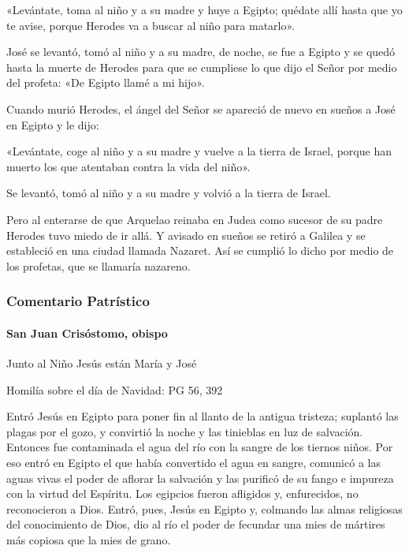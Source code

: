 \documentclass[]{article}
\let\oldparagraph\paragraph
\renewcommand{\paragraph}[1]{\oldparagraph{#1}\mbox{}}
\begin{document}
«Levántate, toma al niño y a su madre y huye a Egipto; quédate allí
hasta que yo te avise, porque Herodes va a buscar al niño para matarlo».

José se levantó, tomó al niño y a su madre, de noche, se fue a Egipto y
se quedó hasta la muerte de Herodes para que se cumpliese lo que dijo el
Señor por medio del profeta: «De Egipto llamé a mi hijo».

Cuando murió Herodes, el ángel del Señor se apareció de nuevo en sueños
a José en Egipto y le dijo:

«Levántate, coge al niño y a su madre y vuelve a la tierra de Israel,
porque han muerto los que atentaban contra la vida del niño».

Se levantó, tomó al niño y a su madre y volvió a la tierra de Israel.

Pero al enterarse de que Arquelao reinaba en Judea como sucesor de su
padre Herodes tuvo miedo de ir allá. Y avisado en sueños se retiró a
Galilea y se estableció en una ciudad llamada Nazaret. Así se cumplió lo
dicho por medio de los profetas, que se llamaría nazareno.

\protect\hypertarget{_Toc448662810}{}{\protect\hypertarget{_Toc448690329}{}{}}

\subsubsection{Comentario Patrístico}\label{comentario-patruxedstico-8}

\paragraph{San Juan Crisóstomo,
obispo}\label{san-juan-crisuxf3stomo-obispo}

Junto al Niño Jesús están María y José

Homilía sobre el día de Navidad: PG 56, 392

Entró Jesús en Egipto para poner fin al llanto de la antigua tristeza;
suplantó las plagas por el gozo, y convirtió la noche y las tinieblas en
luz de salvación. Entonces fue contaminada el agua del río con la sangre
de los tiernos niños. Por eso entró en Egipto el que había convertido el
agua en sangre, comunicó a las aguas vivas el poder de aflorar la
salvación y las purificó de su fango e impureza con la virtud del
Espíritu. Los egipcios fueron afligidos y, enfurecidos, no reconocieron
a Dios. Entró, pues, Jesús en Egipto y, colmando las almas religiosas
del conocimiento de Dios, dio al río el poder de fecundar una mies de
mártires más copiosa que la mies de grano.
\end{document}
